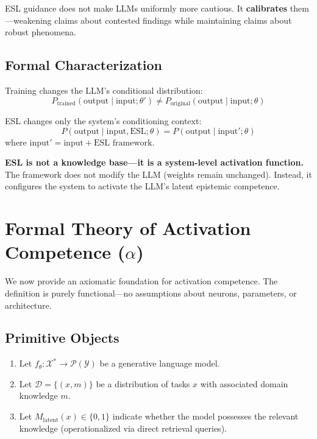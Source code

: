 \documentclass[11pt,a4paper]{article}
\begin{document}
ESL guidance does not make LLMs uniformly more cautious. It \textbf{calibrates} them---weakening claims about contested findings while maintaining claims about robust phenomena.


\subsection{Formal Characterization}

Training changes the LLM's conditional distribution:
\begin{equation}
P_{\text{trained}}(\text{output} \mid \text{input}; \theta') \neq P_{\text{original}}(\text{output} \mid \text{input}; \theta)
\end{equation}

ESL changes only the system's conditioning context:
\begin{equation}
P(\text{output} \mid \text{input}, \text{ESL}; \theta) = P(\text{output} \mid \text{input}'; \theta)
\end{equation}
where $\text{input}' = \text{input} + \text{ESL framework}$.

\begin{principlebox}
\textbf{ESL is not a knowledge base---it is a system-level activation function.} The framework does not modify the LLM (weights remain unchanged). Instead, it configures the system to activate the LLM's latent epistemic competence.
\end{principlebox}



\section{Formal Theory of Activation Competence ($\alpha$)}

We now provide an axiomatic foundation for activation competence. The definition is purely functional---no assumptions about neurons, parameters, or architecture.

\subsection{Primitive Objects}

\begin{enumerate}
    \item Let $f_\theta : \mathcal{X}^* \to \mathcal{P}(\mathcal{Y})$ be a generative language model.
    \item Let $\mathcal{D} = \{(x, m)\}$ be a distribution of tasks $x$ with associated domain knowledge $m$.
    \item Let $M_{\text{latent}}(x) \in \{0,1\}$ indicate whether the model possesses the relevant knowledge (operationalized via direct retrieval queries).
\end{enumerate}
\end{document}
